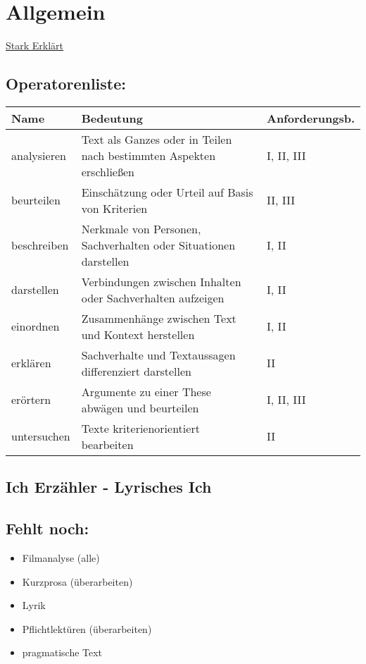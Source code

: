 
\section{Allgemein}


 \href{https://www.youtube.com/playlist?list=PLFQhWtJUIAq00wSOlfr-xGlOsD8IETL3G}{Stark Erklärt}

\subsection{Operatorenliste:}

\setlength{\tabcolsep}{4pt}

\renewcommand{\arraystretch}{1.3}
\begin{tabular}{|p{2cm}|p{6.7cm}|p{2.5cm}|}
    \hline
    Name & Bedeutung & Anforderungsb. \\
    \hline
    analysieren & Text als Ganzes oder in Teilen nach bestimmten Aspekten erschließen & I, II, III \\
    \hline
    beurteilen & Einschätzung oder Urteil auf Basis von Kriterien & II, III \\
    \hline
    beschreiben & Nerkmale von Personen, Sachverhalten oder Situationen darstellen & I, II \\
    \hline
    darstellen & Verbindungen zwischen Inhalten oder Sachverhalten aufzeigen & I, II \\
    \hline 
    einordnen & Zusammenhänge zwischen Text und Kontext herstellen & I, II \\
    \hline
    erklären & Sachverhalte und Textaussagen differenziert darstellen & II \\
    \hline
    erörtern & Argumente zu einer These abwägen und beurteilen & I, II, III \\
    \hline 
    untersuchen & Texte kriterienorientiert bearbeiten & II \\
    \hline
\end{tabular}

\subsection{Ich Erzähler - Lyrisches Ich}



\subsection{Fehlt noch:}
\begin{itemize}
    \item Filmanalyse (alle)
    \item Kurzprosa (überarbeiten)
    \item Lyrik
    \item Pflichtlektüren (überarbeiten)
    \item pragmatische Text
\end{itemize}


